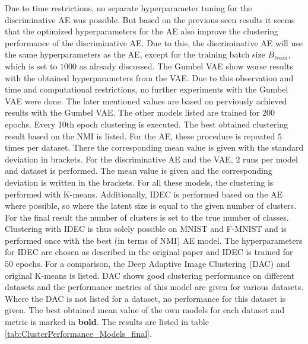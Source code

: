 \documentclass[12pt,DIV14,BCOR12mm,a4paper,footexclude,headinclude,halfparskip-,twoside,openright,cleardoubleempty,idxtotoc,bibtotoc,listtotoc,abstracton]{scrreprt} %
\numberwithin{equation}{chapter}
\begin{document}
Due to time restrictions, no separate hyperparameter tuning for the discriminative AE was possible. But based on the previous seen results it seems that the optimized hyperparameters for the AE also improve the clustering performance of the discriminative AE. Due to this, the discriminative AE will use the same hyperparameters as the AE, except for the training batch size $B_{train}$, which is set to $1000$ as already discussed. The Gumbel VAE show worse results with the obtained hyperparameters from the VAE. Due to this observation and time and computational restrictions, no further experiments with the Gumbel VAE were done. The later mentioned values are based on perviously achieved results with the Gumbel VAE. The other models listed are trained for $200$ epochs. Every 10th epoch clustering is executed. The best obtained clustering result based on the NMI is listed. For the AE, these procedure is repeated $5$ times per dataset. There the corresponding mean value is given with the standard deviation in brackets. For the discriminative AE and the VAE, $2$ runs per model and dataset is performed. The mean value is given and the corresponding deviation is written in the brackets. For all these models, the clustering is performed with K-means. Additionally, IDEC is performed based on the AE where possible, so where the latent size is equal to the given number of clusters. For the final result the number of clusters is set to the true number of classes. Clustering with IDEC is thus solely possible on MNIST and F-MNIST and is performed once with the best (in terms of NMI) AE model. The hyperparameters for IDEC are chosen as described in the original paper \cite{Guo17IDEC} and IDEC is trained for $50$ epochs. For a comparison, the Deep Adaptive Image Clustering (DAC) \cite{Chang17DAC} and original K-means is listed. DAC shows good clustering performance on different datasets and the performance metrics of this model are given for various datasets. Where the DAC is not listed for a dataset, no performance for this dataset is given. The best obtained mean value of the own models for each dataset and metric is marked in \textbf{bold}. The results are listed in table \ref{tab:ClusterPerformance_Models_final}.\\
\end{document}
